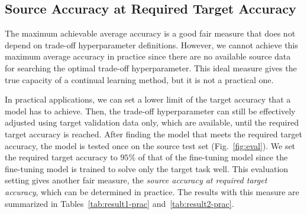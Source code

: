 \documentclass[letterpaper]{article}
\begin{document}
\subsection{Source Accuracy at Required Target Accuracy}



The maximum achievable average accuracy is a good fair measure that does not depend on trade-off hyperparameter definitions. However, we cannot achieve this maximum average accuracy in practice since there are no available source data for searching the optimal trade-off hyperparameter. This ideal measure gives the true capacity of a continual learning method, but it is not a practical one.









In practical applications, we can set a lower limit of the target accuracy that a model has to achieve. Then, the trade-off hyperparameter can still be effectively adjusted using target validation data only, which are available, until the required target accuracy is reached. After finding the model that meets the required target accuracy, the model is tested once on the source test set (Fig.~\ref{fig:eval}). We set the required target accuracy to $95\%$ of that of the fine-tuning model since the fine-tuning model is trained to solve only the target task well. This evaluation setting gives another fair measure, the \textit{source accuracy at required target accuracy}, which can be determined in practice. The results with this measure are summarized in Tables~\ref{tab:result1-prac} and~\ref{tab:result2-prac}. 






\begin{table}[t]
\caption{Source accuracies at required target accuracy[\%] of each method.}
\begin{center}
\end{center}
\label{tab:result1-prac}
\end{table}
\end{document}
